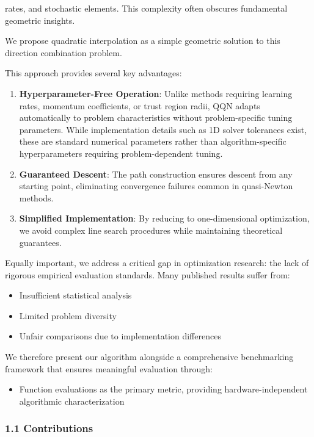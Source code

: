 rates, and stochastic elements. This complexity often obscures fundamental geometric insights.

We propose quadratic interpolation as a simple geometric solution to this direction combination problem.

This approach provides several key advantages:

\begin{enumerate}
\def\labelenumi{\arabic{enumi}.}
\item
  \textbf{Hyperparameter-Free Operation}: Unlike methods requiring learning rates, momentum coefficients, or trust region
  radii, QQN adapts automatically to problem characteristics without problem-specific tuning parameters. While
  implementation details such as 1D solver tolerances exist, these are standard numerical parameters rather than
  algorithm-specific hyperparameters requiring problem-dependent tuning.
\item
  \textbf{Guaranteed Descent}: The path construction ensures descent from any starting point, eliminating convergence
  failures common in quasi-Newton methods.
\item
  \textbf{Simplified Implementation}: By reducing to one-dimensional optimization, we avoid complex line search procedures
  while maintaining theoretical guarantees.
\end{enumerate}

Equally important, we address a critical gap in optimization research: the lack of rigorous empirical evaluation
standards. Many published results suffer from:

\begin{itemize}
\tightlist
\item
  Insufficient statistical analysis
\item
  Limited problem diversity
\item
  Unfair comparisons due to implementation differences
\end{itemize}

We therefore present our algorithm alongside a comprehensive benchmarking framework that ensures meaningful evaluation
through:

\begin{itemize}
\tightlist
\item
  Function evaluations as the primary metric, providing hardware-independent algorithmic characterization
\end{itemize}

\hypertarget{contributions}{%
\subsubsection{1.1 Contributions}\label{contributions}}

